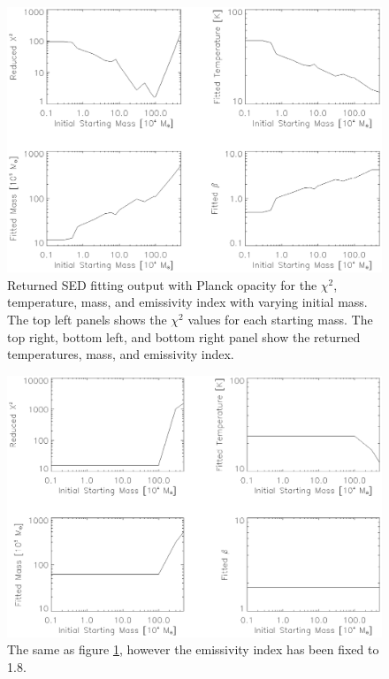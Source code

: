 \begin{figure}
  \centering
  \includegraphics[width=1.\textwidth]{sed_imgs/beta_f_return.eps}
  \caption[Initial Mass Dependence and Convergence of SED Fits for Region Fluxes and Variable Emissivity Index]{Returned SED fitting output with Planck opacity for the $\chi^2$, temperature, mass, and emissivity index with varying initial mass.  The top left panels shows the $\chi^2$ values for each starting mass.  The top right, bottom left, and bottom right panel show the returned temperatures, mass, and emissivity index.}
  \label{fig:init_mass_bf}
\end{figure}

\begin{figure}
  \centering
  \includegraphics[width=1.\textwidth]{sed_imgs/beta_1_return.eps}
  \caption[Initial Mass Dependence and Convergence of SED Fits for Region Fluxes and Fixed Emissivity Index]{The same as figure \ref{fig:init_mass_bf}, however the emissivity index has been fixed to 1.8.}
  \label{fig:init_mass_b1}
\end{figure}

